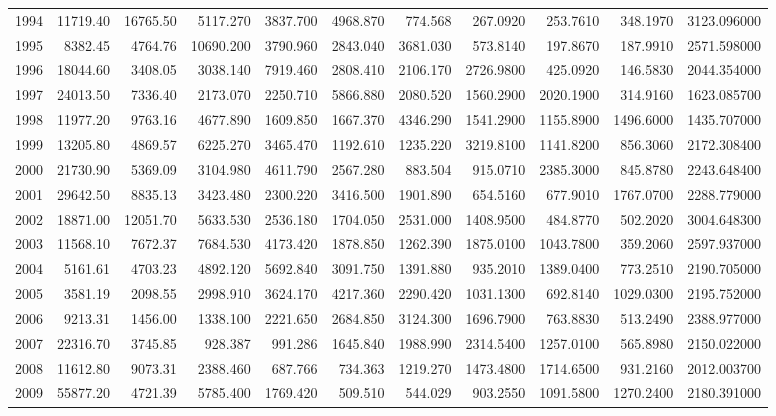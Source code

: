 \documentclass[]{article}
\begin{document}
\begin{table}[ht]
\begin{tabular}{rrrrrrrrrrr}
  1994 & 11719.40 & 16765.50 & 5117.270 & 3837.700 & 4968.870 & 774.568 & 267.0920 & 253.7610 & 348.1970 & 3123.096000 \\ 
  1995 & 8382.45 & 4764.76 & 10690.200 & 3790.960 & 2843.040 & 3681.030 & 573.8140 & 197.8670 & 187.9910 & 2571.598000 \\ 
  1996 & 18044.60 & 3408.05 & 3038.140 & 7919.460 & 2808.410 & 2106.170 & 2726.9800 & 425.0920 & 146.5830 & 2044.354000 \\ 
  1997 & 24013.50 & 7336.40 & 2173.070 & 2250.710 & 5866.880 & 2080.520 & 1560.2900 & 2020.1900 & 314.9160 & 1623.085700 \\ 
  1998 & 11977.20 & 9763.16 & 4677.890 & 1609.850 & 1667.370 & 4346.290 & 1541.2900 & 1155.8900 & 1496.6000 & 1435.707000 \\ 
  1999 & 13205.80 & 4869.57 & 6225.270 & 3465.470 & 1192.610 & 1235.220 & 3219.8100 & 1141.8200 & 856.3060 & 2172.308400 \\ 
  2000 & 21730.90 & 5369.09 & 3104.980 & 4611.790 & 2567.280 & 883.504 & 915.0710 & 2385.3000 & 845.8780 & 2243.648400 \\ 
  2001 & 29642.50 & 8835.13 & 3423.480 & 2300.220 & 3416.500 & 1901.890 & 654.5160 & 677.9010 & 1767.0700 & 2288.779000 \\ 
  2002 & 18871.00 & 12051.70 & 5633.530 & 2536.180 & 1704.050 & 2531.000 & 1408.9500 & 484.8770 & 502.2020 & 3004.648300 \\ 
  2003 & 11568.10 & 7672.37 & 7684.530 & 4173.420 & 1878.850 & 1262.390 & 1875.0100 & 1043.7800 & 359.2060 & 2597.937000 \\ 
  2004 & 5161.61 & 4703.23 & 4892.120 & 5692.840 & 3091.750 & 1391.880 & 935.2010 & 1389.0400 & 773.2510 & 2190.705000 \\ 
  2005 & 3581.19 & 2098.55 & 2998.910 & 3624.170 & 4217.360 & 2290.420 & 1031.1300 & 692.8140 & 1029.0300 & 2195.752000 \\ 
  2006 & 9213.31 & 1456.00 & 1338.100 & 2221.650 & 2684.850 & 3124.300 & 1696.7900 & 763.8830 & 513.2490 & 2388.977000 \\ 
  2007 & 22316.70 & 3745.85 & 928.387 & 991.286 & 1645.840 & 1988.990 & 2314.5400 & 1257.0100 & 565.8980 & 2150.022000 \\ 
  2008 & 11612.80 & 9073.31 & 2388.460 & 687.766 & 734.363 & 1219.270 & 1473.4800 & 1714.6500 & 931.2160 & 2012.003700 \\ 
  2009 & 55877.20 & 4721.39 & 5785.400 & 1769.420 & 509.510 & 544.029 & 903.2550 & 1091.5800 & 1270.2400 & 2180.391000 \\ 

\end{tabular}
\end{table}
\end{document}
